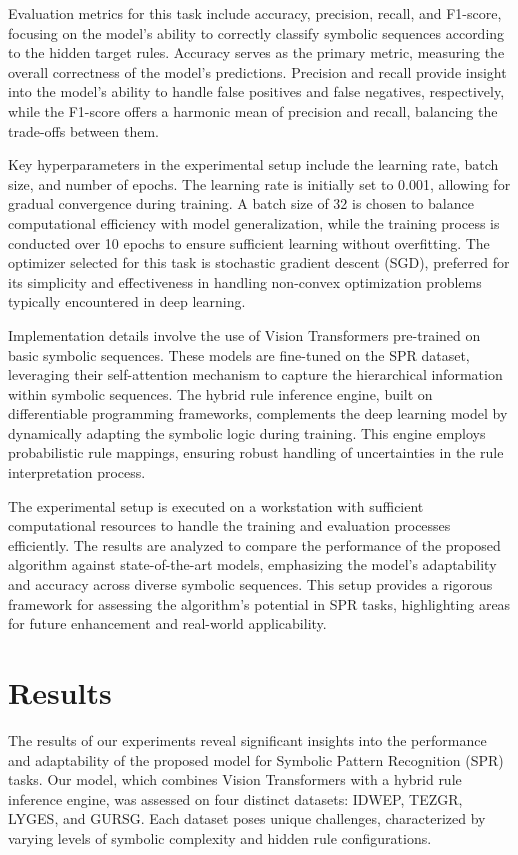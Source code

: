 \documentclass{article}
\begin{document}
Evaluation metrics for this task include accuracy, precision, recall, and F1-score, focusing on the model's ability to correctly classify symbolic sequences according to the hidden target rules. Accuracy serves as the primary metric, measuring the overall correctness of the model's predictions. Precision and recall provide insight into the model's ability to handle false positives and false negatives, respectively, while the F1-score offers a harmonic mean of precision and recall, balancing the trade-offs between them.

Key hyperparameters in the experimental setup include the learning rate, batch size, and number of epochs. The learning rate is initially set to 0.001, allowing for gradual convergence during training. A batch size of 32 is chosen to balance computational efficiency with model generalization, while the training process is conducted over 10 epochs to ensure sufficient learning without overfitting. The optimizer selected for this task is stochastic gradient descent (SGD), preferred for its simplicity and effectiveness in handling non-convex optimization problems typically encountered in deep learning.

Implementation details involve the use of Vision Transformers pre-trained on basic symbolic sequences. These models are fine-tuned on the SPR dataset, leveraging their self-attention mechanism to capture the hierarchical information within symbolic sequences. The hybrid rule inference engine, built on differentiable programming frameworks, complements the deep learning model by dynamically adapting the symbolic logic during training. This engine employs probabilistic rule mappings, ensuring robust handling of uncertainties in the rule interpretation process.

The experimental setup is executed on a workstation with sufficient computational resources to handle the training and evaluation processes efficiently. The results are analyzed to compare the performance of the proposed algorithm against state-of-the-art models, emphasizing the model's adaptability and accuracy across diverse symbolic sequences. This setup provides a rigorous framework for assessing the algorithm's potential in SPR tasks, highlighting areas for future enhancement and real-world applicability.

\section{Results}
The results of our experiments reveal significant insights into the performance and adaptability of the proposed model for Symbolic Pattern Recognition (SPR) tasks. Our model, which combines Vision Transformers with a hybrid rule inference engine, was assessed on four distinct datasets: IDWEP, TEZGR, LYGES, and GURSG. Each dataset poses unique challenges, characterized by varying levels of symbolic complexity and hidden rule configurations.
\end{document}
